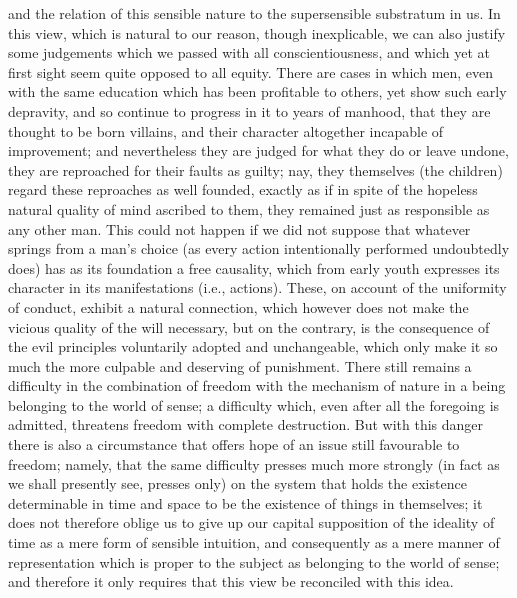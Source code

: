 \documentclass[12pt]{article}
\begin{document}
and the relation of this sensible nature to the supersensible substratum in us. In this view, which is natural to our reason, though inexplicable, we can also justify some judgements which we passed with all conscientiousness, and which yet at first sight seem quite opposed to all equity. There are cases in which men, even with the same education which has been profitable to others, yet show such early depravity, and so continue to progress in it to years of manhood, that they are thought to be born villains, and their character altogether incapable of improvement; and nevertheless they are judged for what they do or leave undone, they are reproached for their faults as guilty; nay, they themselves (the children) regard these reproaches as well founded, exactly as if in spite of the hopeless natural quality of mind ascribed to them, they remained just as responsible as any other man. This could not happen if we did not suppose that whatever springs from a man's choice (as every action intentionally performed undoubtedly does) has as its foundation a free causality, which from early youth expresses its character in its manifestations (i.e., actions). These, on account of the uniformity of conduct, exhibit a natural connection, which however does not make the vicious quality of the will necessary, but on the contrary, is the consequence of the evil principles voluntarily adopted and unchangeable, which only make it so much the more culpable and deserving of punishment. There still remains a difficulty in the combination of freedom with the mechanism of nature in a being belonging to the world of sense; a difficulty which, even after all the foregoing is admitted, threatens freedom with complete destruction. But with this danger there is also a circumstance that offers hope of an issue still favourable to freedom; namely, that the same difficulty presses much more strongly (in fact as we shall presently see, presses only) on the system that holds the existence determinable in time and space to be the existence of things in themselves; it does not therefore oblige us to give up our capital supposition of the ideality of time as a mere form of sensible intuition, and consequently as a mere manner of representation which is proper to the subject as belonging to the world of sense; and therefore it only requires that this view be reconciled with this idea.
\end{document}
